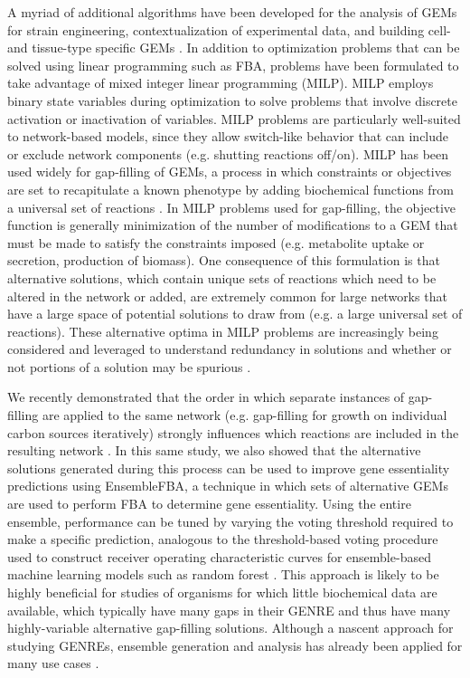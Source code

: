 \documentclass[11pt,twocolumn,notitlepage,openany,twoside]{book}
\begin{document}
\begin{refsection}
A myriad of additional algorithms have been developed for the analysis of GEMs for strain engineering, contextualization of experimental data, and building cell- and tissue-type specific GEMs \cite{Blazier2012-oo,Machado2014-wi,Wang2017-sp}. In addition to optimization problems that can be solved using linear programming such as FBA, problems have been formulated to take advantage of mixed integer linear programming (MILP). MILP employs binary state variables during optimization to solve problems that involve discrete activation or inactivation of variables. MILP problems are particularly well-suited to network-based models, since they allow switch-like behavior that can include or exclude network components (e.g. shutting reactions off/on). MILP has been used widely for gap-filling of GEMs, a process in which constraints or objectives are set to recapitulate a known phenotype by adding biochemical functions from a universal set of reactions \cite{Reed2006-qv}. In MILP problems used for gap-filling, the objective function is generally minimization of the number of modifications to a GEM that must be made to satisfy the constraints imposed (e.g. metabolite uptake or secretion, production of biomass). One consequence of this formulation is that alternative solutions, which contain unique sets of reactions which need to be altered in the network or added, are extremely common for large networks that have a large space of potential solutions to draw from (e.g. a large universal set of reactions). These alternative optima in MILP problems are increasingly being considered and leveraged to understand redundancy in solutions and whether or not portions of a solution may be spurious \cite{Karp2018-hd,Robaina-Estevez2017-fy,Rossell2013-cf}.

We recently demonstrated that the order in which separate instances of gap-filling are applied to the same network (e.g. gap-filling for growth on individual carbon sources iteratively) strongly influences which reactions are included in the resulting network \cite{Biggs2017-md}. In this same study, we also showed that the alternative solutions generated during this process can be used to improve gene essentiality predictions using EnsembleFBA, a technique in which sets of alternative GEMs are used to perform FBA to determine gene essentiality. Using the entire ensemble, performance can be tuned by varying the voting threshold required to make a specific prediction, analogous to the threshold-based voting procedure used to construct receiver operating characteristic curves for ensemble-based machine learning models such as random forest \cite{Breiman2001-pl}. This approach is likely to be highly beneficial for studies of organisms for which little biochemical data are available, which typically have many gaps in their GENRE and thus have many highly-variable alternative gap-filling solutions. Although a nascent approach for studying GENREs, ensemble generation and analysis has already been applied for many use cases \cite{Machado2018-cz,Medlock2018-ub,Medlock2018-kx}.


\end{refsection}
\end{document}

